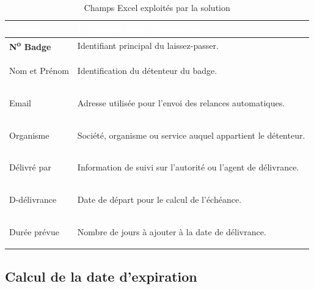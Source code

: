 \documentclass[12pt,a4paper,openany]{report}
\begin{document}
\begin{table}[H]
\centering
\small
\renewcommand{\arraystretch}{1.5} %
\setlength{\arrayrulewidth}{1pt} %

\begin{tabularx}{\textwidth}{|>{\raggedright\arraybackslash\bfseries}p{}|>{\raggedright\arraybackslash}X|}
\hline
\rowcolor{ondaBlue} 
\textcolor{white}{\textbf{Champ}} & \textcolor{white}{\textbf{Utilisation dans l'application}} \\
\hline

\rowcolor{ondaBlue!5} 
N\textsuperscript{o} Badge & Identifiant principal du laissez-passer. \\
\hline

Nom et Prénom & Identification du détenteur du badge. \\
\hline

\rowcolor{ondaBlue!5} 
Email & Adresse utilisée pour l'envoi des relances automatiques. \\
\hline

Organisme & Société, organisme ou service auquel appartient le détenteur. \\
\hline

\rowcolor{ondaBlue!5} 
Délivré par & Information de suivi sur l'autorité ou l'agent de délivrance. \\
\hline

D-délivrance & Date de départ pour le calcul de l'échéance. \\
\hline

\rowcolor{ondaBlue!5} 
Durée prévue & Nombre de jours à ajouter à la date de délivrance. \\
\hline

\end{tabularx}
\caption{Champs Excel exploités par la solution}
\label{tab:champs-excel} %
\end{table}

\subsection{Calcul de la date d'expiration}
\end{document}
